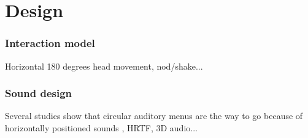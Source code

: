 \chapter{Design}

\subsection{Interaction model}
Horizontal 180 degrees head movement, nod/shake...


\subsection{Sound design}
Several studies show that circular auditory menus are the way to go because of horizontally positioned sounds , HRTF, 3D audio...



